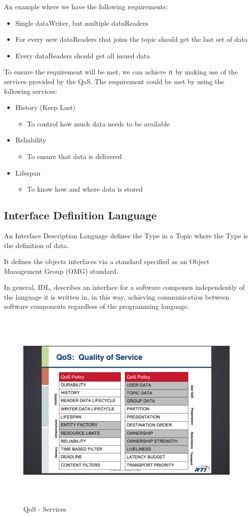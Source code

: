 An example where we have the following requirements:

\begin{itemize}
\item Single dataWriter, but multiple dataReaders
\item For every new dataReaders that joins the topic should get the last set of data
\item Every dataReaders should get all issued data
\end{itemize}

To ensure the requirement will be met, we can achieve it by making use of the services provided by the QoS. The requirement could be met by using the following services:

\begin{itemize}
\item History (Keep Last)
\begin{itemize}
\item To control how much data needs to be available
\end{itemize}
\item Reliability
\begin{itemize}
\item To ensure that data is delivered
\end{itemize}
\item Lifespan
\begin{itemize}
\item To know how and where data is stored
\end{itemize}
\end{itemize}

\subsection{Interface Definition Language}
An Interface Description Language defines the Type in a Topic where the Type is the definition of data.

It defines the objects interfaces via a standard specified as an Object Management Group (OMG) standard.

In general, IDL, describes an interface for a software componen independently of the language it is written in, in this way, achieving communication between software components regardless of the programming language.


\begin{figure}[h]
\centering
\includegraphics[height=100mm, keepaspectratio]{img/dds_question_4-6/QoS_services}
\caption{QoS - Services}
\label{QoS - Services}
\end{figure}

